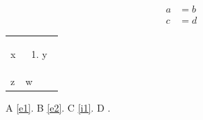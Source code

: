 \documentclass{article}
\begin{document}
\begin{align}a&=b\label{e1}\\ c&=d\label{e2}\end{align}
\begin{tabular}{ll}
x & \begin{minipage}{3cm}\begin{enumerate}\item\label{i1} y\end{enumerate}\end{minipage}\\
z & w
\end{tabular}
A \cref{e1}. B \cref{e2}. C \cref{i1}. D .
\end{document}
